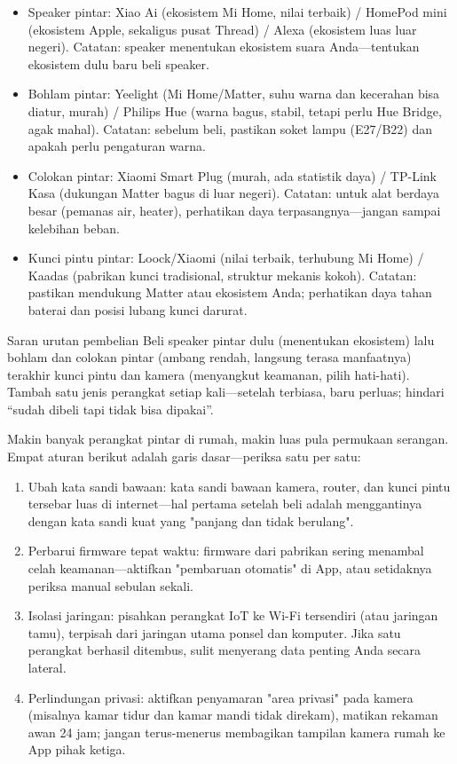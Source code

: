 \begin{itemize}
  \item Speaker pintar: Xiao Ai (ekosistem Mi Home, nilai terbaik) / HomePod mini (ekosistem Apple, sekaligus pusat Thread) / Alexa (ekosistem luas luar negeri). Catatan: speaker menentukan ekosistem suara Anda—tentukan ekosistem dulu baru beli speaker.
  \item Bohlam pintar: Yeelight (Mi Home/Matter, suhu warna dan kecerahan bisa diatur, murah) / Philips Hue (warna bagus, stabil, tetapi perlu Hue Bridge, agak mahal). Catatan: sebelum beli, pastikan soket lampu (E27/B22) dan apakah perlu pengaturan warna.
  \item Colokan pintar: Xiaomi Smart Plug (murah, ada statistik daya) / TP-Link Kasa (dukungan Matter bagus di luar negeri). Catatan: untuk alat berdaya besar (pemanas air, heater), perhatikan daya terpasangnya—jangan sampai kelebihan beban.
  \item Kunci pintu pintar: Loock/Xiaomi (nilai terbaik, terhubung Mi Home) / Kaadas (pabrikan kunci tradisional, struktur mekanis kokoh). Catatan: pastikan mendukung Matter atau ekosistem Anda; perhatikan daya tahan baterai dan posisi lubang kunci darurat.
\end{itemize}

\begin{tcbinfo}{Saran urutan pembelian}
Beli speaker pintar dulu (menentukan ekosistem) lalu bohlam dan colokan pintar (ambang rendah, langsung terasa manfaatnya) terakhir kunci pintu dan kamera (menyangkut keamanan, pilih hati-hati). Tambah satu jenis perangkat setiap kali—setelah terbiasa, baru perluas; hindari “sudah dibeli tapi tidak bisa dipakai”.

\end{tcbinfo}


Makin banyak perangkat pintar di rumah, makin luas pula permukaan serangan. Empat aturan berikut adalah garis dasar—periksa satu per satu:

\begin{enumerate}
  \item Ubah kata sandi bawaan: kata sandi bawaan kamera, router, dan kunci pintu tersebar luas di internet—hal pertama setelah beli adalah menggantinya dengan kata sandi kuat yang "panjang dan tidak berulang".
  \item Perbarui firmware tepat waktu: firmware dari pabrikan sering menambal celah keamanan—aktifkan "pembaruan otomatis" di App, atau setidaknya periksa manual sebulan sekali.
  \item Isolasi jaringan: pisahkan perangkat IoT ke Wi-Fi tersendiri (atau jaringan tamu), terpisah dari jaringan utama ponsel dan komputer. Jika satu perangkat berhasil ditembus, sulit menyerang data penting Anda secara lateral.
  \item Perlindungan privasi: aktifkan penyamaran "area privasi" pada kamera (misalnya kamar tidur dan kamar mandi tidak direkam), matikan rekaman awan 24 jam; jangan terus-menerus membagikan tampilan kamera rumah ke App pihak ketiga.
\end{enumerate}

